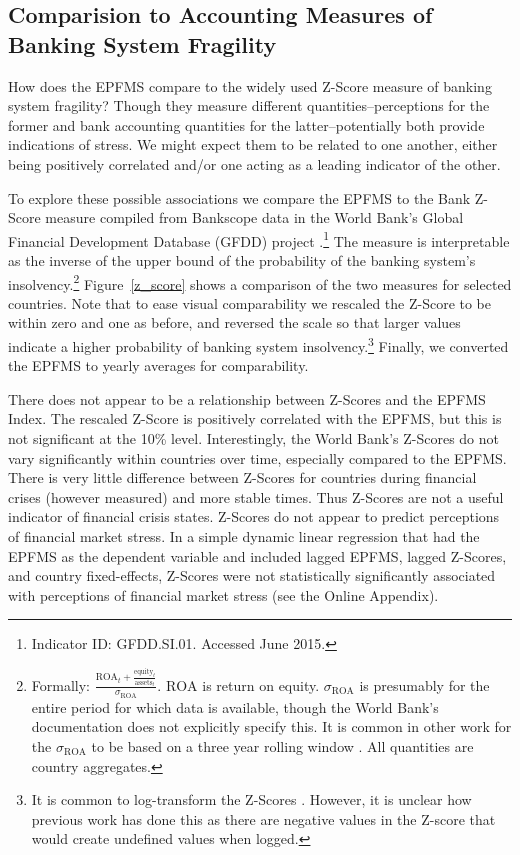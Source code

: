 \documentclass[]{article}
\begin{document}
\subsection{Comparision to Accounting Measures of Banking System Fragility}

How does the EPFMS compare to the widely used Z-Score measure of banking system fragility? Though they measure different quantities--perceptions for the former and bank accounting quantities for the latter--potentially both provide indications of stress. We might expect them to be related to one another, either being positively correlated and/or one acting as a leading indicator of the other.

To explore these possible associations we compare the EPFMS to the Bank Z-Score measure compiled from Bankscope data in the World Bank's Global Financial Development Database (GFDD) project \citep{worldbank2013}.\footnote{Indicator ID: GFDD.SI.01. Accessed June 2015.} The measure is interpretable as the inverse of the upper bound of the probability of the banking system's insolvency.\footnote{Formally: $\frac{\mathrm{ROA}_{t} + \frac{\mathrm{equity}_{t}}{\mathrm{assets}_{t}}}{\sigma_{\mathrm{ROA}}}$. $\mathrm{ROA}$ is return on equity. $\sigma_{\mathrm{ROA}}$ is presumably for the entire period for which data is available, though the World Bank's documentation does not explicitly specify this. It is common in other work for the $\sigma_{\mathrm{ROA}}$ to be based on a three year rolling window \cite[225]{beck2013bank}. All quantities are country aggregates.} Figure~\ref{z_score} shows a comparison of the two measures for selected countries. Note that to ease visual comparability we rescaled the Z-Score to be within zero and one as before, and reversed the scale so that larger values indicate a higher probability of banking system insolvency.\footnote{It is common to log-transform the Z-Scores \cite[225]{beck2013bank}. However, it is unclear how previous work has done this as there are negative values in the Z-score that would create undefined values when logged.} Finally, we converted the EPFMS to yearly averages for comparability.

There does not appear to be a relationship between Z-Scores and the EPFMS Index. The rescaled Z-Score is positively correlated with the EPFMS, but this is not significant at the 10\% level. Interestingly, the World Bank's Z-Scores do not vary significantly within countries over time, especially compared to the EPFMS. There is very little difference between Z-Scores for countries during financial crises (however measured) and more stable times. Thus Z-Scores are not a useful indicator of financial crisis states. Z-Scores do not appear to predict perceptions of financial market stress. In a simple dynamic linear regression that had the EPFMS as the dependent variable and included lagged EPFMS, lagged Z-Scores, and country fixed-effects, Z-Scores were not statistically significantly associated with perceptions of financial market stress (see the Online Appendix).
\end{document}
